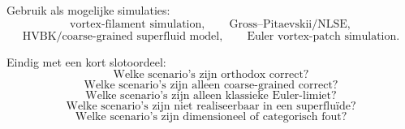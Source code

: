 \documentclass[11pt]{article}
\begin{document}
        Gebruik als mogelijke simulaties:
        \[
            \text{vortex-filament simulation},
            \qquad
            \text{Gross--Pitaevskii/NLSE},
        \]
        \[
            \text{HVBK/coarse-grained superfluid model},
            \qquad
            \text{Euler vortex-patch simulation}.
        \]
        
        Eindig met een kort slotoordeel:
        \[
            \text{Welke scenario's zijn orthodox correct?}
        \]
        \[
            \text{Welke scenario's zijn alleen coarse-grained correct?}
        \]
        \[
            \text{Welke scenario's zijn alleen klassieke Euler-limiet?}
        \]
        \[
            \text{Welke scenario's zijn niet realiseerbaar in een superfluïde?}
        \]
        \[
            \text{Welke scenario's zijn dimensioneel of categorisch fout?}
        \]
\end{document}
